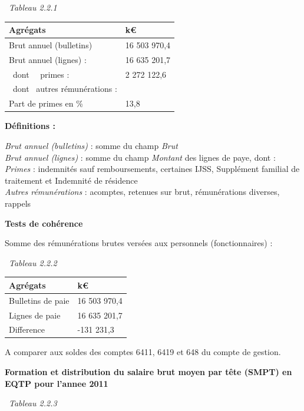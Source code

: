~\emph{Tableau 2.2.1}

\begin{longtable}[]{@{}ll@{}}
\toprule
Agrégats & k€\tabularnewline
\midrule
\endhead
Brut annuel (bulletins) & 16 503 970,4\tabularnewline
Brut annuel (lignes) : & 16 635 201,7\tabularnewline
~dont ~~primes : & 2 272 122,6\tabularnewline
~dont ~autres rémunérations : &\tabularnewline
Part de primes en \% & 13,8\tabularnewline
\bottomrule
\end{longtable}

\textbf{Définitions :}

\emph{Brut annuel (bulletins)} : somme du champ \emph{Brut}\\
\emph{Brut annuel (lignes)} : somme du champ \emph{Montant} des lignes
de paye, dont :\\
\emph{Primes} : indemnités sauf remboursements, certaines IJSS,
Supplément familial de traitement et Indemnité de résidence\\
\emph{Autres rémunérations} : acomptes, retenues sur brut, rémunérations
diverses, rappels

\textbf{Tests de cohérence}

Somme des rémunérations brutes versées aux personnels (fonctionnaires) :

~\emph{Tableau 2.2.2}

\begin{longtable}[]{@{}ll@{}}
\toprule
Agrégats & k€\tabularnewline
\midrule
\endhead
Bulletins de paie & 16 503 970,4\tabularnewline
Lignes de paie & 16 635 201,7\tabularnewline
Difference & -131 231,3\tabularnewline
\bottomrule
\end{longtable}

A comparer aux soldes des comptes 6411, 6419 et 648 du compte de
gestion.

\textbf{Formation et distribution du salaire brut moyen par tête (SMPT)
en EQTP pour l'annee 2011 }

~\emph{Tableau 2.2.3}

